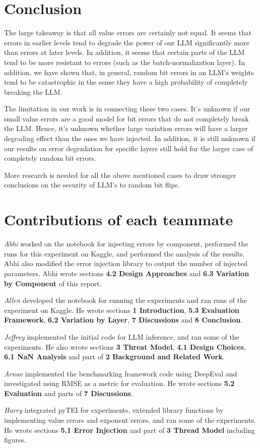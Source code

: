 \section{Conclusion}
\label{sec:conclusion}
The large takeaway is that all value errors are certainly not equal. It seems that errors in earlier levels tend to degrade the power of our LLM significantly more than errors at later levels.
In addition, it seems that certain parts of the LLM tend to be more resistant to errors (such as the batch-normalization layer). In addition, we have shown that, in general,
random bit errors in an LLM's weights tend to be catastrophic in the sense they have a high probability of completely breaking the LLM.

The limitation in our work is in connecting these two cases. It's unknown if our small value errors are a good model for bit errors that do not completely break the LLM. Hence, it's unknown whether
large variation errors will have a larger degrading effect than the ones we have injected. In addition, it is still unknown if our results on error degradation for specific layers still hold for
the larger case of completely random bit errors.

More research is needed for all the above mentioned cases to draw stronger conclusions on the security of LLM's to random bit flips.

\section{Contributions of each teammate}
\textit{Abhi} worked on the notebook for injecting errors by component, performed the runs for this experiment on Kaggle, and performed the analysis of the results. Abhi also modified the error injection library to output the number of injected parameters. Abhi wrote sections \textbf{4.2 Design Approaches} and \textbf{6.3 Variation by Component} of this report.

\textit{Allen} developed the notebook for running the experiments and ran runs of the experiment on Kaggle. He wrote sections \textbf{1 Introduction}, \textbf{5.3 Evaluation Framework}, \textbf{6.2 Variation by Layer}, \textbf{7 Discussions} and \textbf{8 Conclusion}.

\textit{Jeffrey} implemented the initial code for LLM inference, and ran some of the experiments. He also wrote sections \textbf{3 Threat Model}, \textbf{4.1 Design Choices}, \textbf{6.1 NaN Analysis} and part of \textbf{2 Background and Related Work}.

\textit{Arnav} implemented the benchmarking framework code using DeepEval and investigated using RMSE as a metric for evaluation. He wrote sections \textbf{5.2 Evaluation} and parts of \textbf{7 Discussions}.

\textit{Harry} integrated pyTEI for experiments, extended library functions by implementing value errors and exponent errors, and ran some of the experiments. He wrote sections \textbf{5.1 Error Injection} and part of \textbf{3 Thread Model} including figures.


